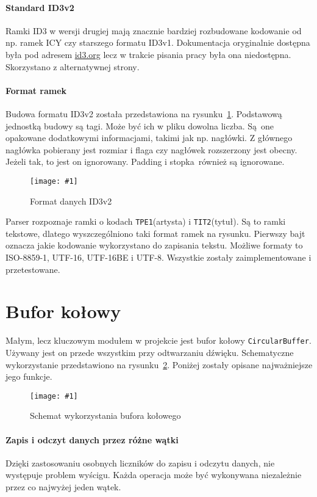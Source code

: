 \documentclass[polish]{aghengthesis}
\newcommand{\imgint}[4]{
	\begin{figure}[{#4}]
		\centering
		\texttt{[image: \#1]}
		\caption{#2}
		\label{#1}
	\end{figure}
}
\newcommand{\imgh}[3]{\imgint{#1}{#2}{#3}{H}}
\begin{document}
			\paragraph{Standard ID3v2}
			Ramki ID3 w wersji drugiej mają znacznie bardziej rozbudowane kodowanie od np. ramek ICY czy starszego formatu ID3v1. Dokumentacja oryginalnie dostępna była pod adresem \href{id3.org}{id3.org} lecz w trakcie pisania pracy była ona niedostępna. Skorzystano z alternatywnej strony\textsuperscript{\cite{id3_spec_mutagen}}.
			
			\paragraph{Format ramek}
			Budowa formatu ID3v2 została przedstawiona na rysunku~\ref{3/PicoRadio-id3}. Podstawową jednostką budowy są tagi. Może być ich w pliku dowolna liczba. Są one opakowane dodatkowymi informacjami, takimi jak np. nagłówki. Z głównego nagłówka pobierany jest rozmiar i flaga czy nagłówek rozszerzony jest obecny. Jeżeli tak, to jest on ignorowany. Padding i stopka również są ignorowane.
			
			\imgh{3/PicoRadio-id3}{Format danych ID3v2}{0.8}
			
			Parser rozpoznaje ramki o kodach \lstinline|TPE1|(artysta) i \lstinline|TIT2|(tytuł). Są to ramki tekstowe, dlatego wyszczególniono taki format ramek na rysunku. Pierwszy bajt oznacza jakie kodowanie wykorzystano do zapisania tekstu. Możliwe formaty to ISO-8859-1, UTF-16, UTF-16BE i UTF-8. Wszystkie zostały zaimplementowane i przetestowane.
	
	\section{Bufor kołowy}
		\label{sec:circular_buffer}
		Małym, lecz kluczowym modułem w projekcie jest bufor kołowy \lstinline|CircularBuffer|. Używany jest on przede wszystkim przy odtwarzaniu dźwięku. Schematyczne wykorzystanie przedstawiono na rysunku~\ref{3/PicoRadio-buffer}. Poniżej zostały opisane najważniejsze jego funkcje.
		
		\imgh{3/PicoRadio-buffer}{Schemat wykorzystania bufora kołowego}{0.8}
		
		\paragraph{Zapis i odczyt danych przez różne wątki}
			Dzięki zastosowaniu osobnych liczników do zapisu i odczytu danych, nie występuje problem wyścigu. Każda operacja może być wykonywana niezależnie przez co najwyżej jeden wątek.
			
\end{document}

